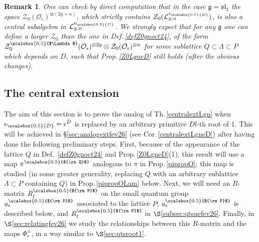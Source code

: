 \documentclass[11pt]{amsart}
\newtheorem{remark}[teo]{Remark}
\newcommand{\e}{\epsilon}
\newcommand{\Ll}{\mathcal{L}}
\newcommand{\Oo}{\mathcal{O}}
\newcommand{\eD}{\epsilon_{\scalebox{0.5}{D}}}
\newcommand{\Q}{{\scalebox{0.5}{${\rm Q}$}}}
\newcommand{\Pup}{{\scalebox{0.5}{${\rm P}$}}}
\newcommand{\Lam}{{\scalebox{0.5}{$\Lambda$}}}
\begin{document}
\begin{remark}\label{centralextsl2eD}{\rm One can check by direct computation that in the case $\mathfrak{g} = \mathfrak{sl}_2$ the space $\mathcal{Z}_0(\Oo_\e)^{\otimes (2g+n)}$, which strictly contains $\mathcal{Z}_0(\Ll_{g,n}^{\eD})$, is also a central subalgebra in $\Ll_{g,n}^{\eD}$. We strongly expect that for any $\mathfrak{g}$ one can define a larger $\mathcal{Z}_0$ than the one in Def.\,\ref{defZ0gnoct24}, of the form $\mathcal{Z}_0^{\Lam}(\Oo_{\e})^{\otimes 2g}\otimes \mathcal{Z}_0(\Oo_{\e})^{\otimes n}$ for some sublattice $Q \subset \Lambda \subset P$ which depends on $D$, such that Prop.\,\ref{Z0LgneD} still holds (after the obvious changes).
}
\end{remark}

\subsection{The central extension} The aim of this section is to prove the analog of Th.\,\ref{centralextLgn} when $\eD=\e^{\bar{D}}$ is replaced by an arbitrary primitive $Dl$-th root of $1$. This will be achieved in \S\ref{sec:analogextfev26} (see Cor.\,\ref{centralextLgneD}) after having done the following preliminary steps. First, because of the appearance of the lattice $Q$ in Def.\, \ref{defZ0gnoct24} and Prop.\,\ref{Z0LgneD}(1), this result will use a map $\pi^\Q$ analogous to $\pi$ in Prop.\,\ref{pipropO}; this map is studied (in some greater generality, replacing $Q$ with an arbitrary sublattice $\Lambda\subset P$ containing $Q$) in Prop.\,\ref{pipropOLam} below. Next, we will need an $R$-matrix $R_l^\Pup$ on the small quantum group $u_\e^\Pup$ associated to the lattice $P$; $u_\e^\Pup$ is described below, and $R_l^\Pup$ in $\S$\ref{subsec:qtsuefev26}. Finally, in $\S$\ref{sec:relatingfev26} we study the relationships between this $R$-matrix and the maps $\Phi_\e^\pm$, in a way similar to $\S$\ref{sec:qtsroot1}.
\smallskip
\end{document}
